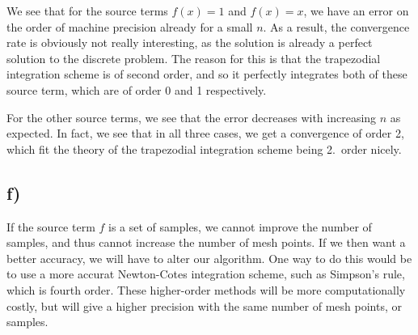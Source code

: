 \documentclass[a4paper, 11pt, notitlepage, english]{article}
\begin{document}
We see that for the source terms $f(x) = 1$ and $f(x)=x$, we have an error on the order of machine precision already for a small $n$. As a result, the convergence rate is obviously not really interesting, as the solution is already a perfect solution to the discrete problem. The reason for this is that the trapezodial integration scheme is of second order, and so it perfectly integrates both of these source term, which are of order 0 and 1 respectively.

For the other source terms, we see that the error decreases with increasing $n$ as expected. In fact, we see that in all three cases, we get a convergence of order 2, which fit the theory of the trapezodial integration scheme being 2.\ order nicely. 

\subsection*{f)}

If the source term $f$ is a set of samples, we cannot improve the number of samples, and thus cannot increase the number of mesh points. If we then want a better accuracy, we will have to alter our algorithm. One way to do this would be to use a more accurat Newton-Cotes integration scheme, such as Simpson's rule, which is fourth order. These higher-order methods will be more computationally costly, but will give a higher precision with the same number of mesh points, or samples.
\end{document}

